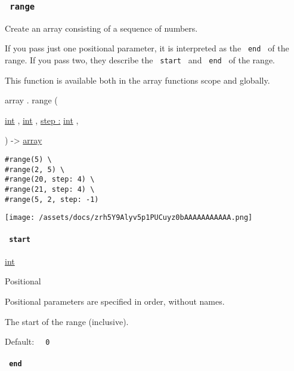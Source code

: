 \subsubsection{\texorpdfstring{\texttt{\ range\ }}{ range }}\label{definitions-range}

Create an array consisting of a sequence of numbers.

If you pass just one positional parameter, it is interpreted as the
\texttt{\ end\ } of the range. If you pass two, they describe the
\texttt{\ start\ } and \texttt{\ end\ } of the range.

This function is available both in the array function\textquotesingle s
scope and globally.

array { . } { range } (

{ \href{/docs/reference/foundations/int/}{int} , } {
\href{/docs/reference/foundations/int/}{int} , } {
\hyperref[definitions-range-parameters-step]{step :}
\href{/docs/reference/foundations/int/}{int} , }

) -\textgreater{} \href{/docs/reference/foundations/array/}{array}

\begin{verbatim}
#range(5) \
#range(2, 5) \
#range(20, step: 4) \
#range(21, step: 4) \
#range(5, 2, step: -1)
\end{verbatim}

\texttt{[image: /assets/docs/zrh5Y9Alyv5p1PUCuyz0bAAAAAAAAAAA.png]}

\paragraph{\texorpdfstring{\texttt{\ start\ }}{ start }}\label{definitions-range-start}

\href{/docs/reference/foundations/int/}{int}

{{ Positional }}

\label{definitions-range-start-positional-tooltip}
Positional parameters are specified in order, without names.

The start of the range (inclusive).

Default: \texttt{\ }{\texttt{\ 0\ }}\texttt{\ }

\paragraph{\texorpdfstring{\texttt{\ end\ }}{ end }}\label{definitions-range-end}

